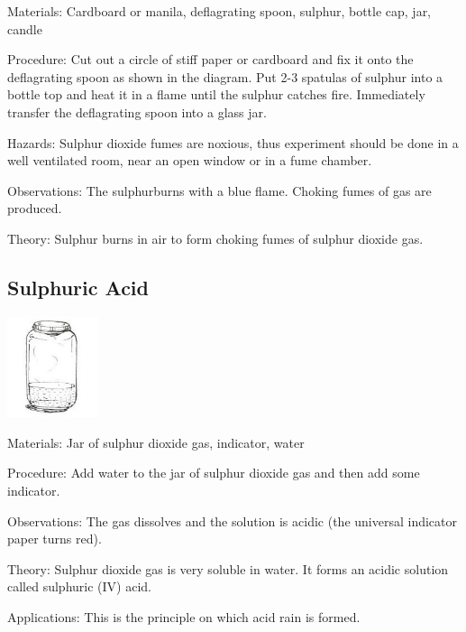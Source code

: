 \begin{multicols}{2}
\begin{description*}
\item[Materials:]{Cardboard or manila, deflagrating spoon, sulphur, bottle cap, jar, candle}
\item[Procedure:]{Cut out a circle of stiff paper or cardboard and
fix it onto the deflagrating spoon as shown in the
diagram. Put 2-3 spatulas of sulphur into a bottle
top and heat it in a flame until the sulphur
catches fire. Immediately transfer the
deflagrating spoon into a glass jar.}
\item[Hazards:]{Sulphur dioxide fumes are noxious, thus
experiment should be done in a well ventilated
room, near an open window or in a fume
chamber.}
\item[Observations:]{The sulphurburns with a blue flame. Choking
fumes of gas are produced.}
\item[Theory:]{Sulphur burns in air to form choking fumes
of sulphur dioxide gas.}
\end{description*}

\subsection{Sulphuric Acid} 

\begin{center}
\includegraphics[width=0.2\textwidth]{./img/source/sulphuric-acid.jpg}
\end{center}

\begin{description*}
\item[Materials:]{Jar of sulphur dioxide gas, indicator, water}
\item[Procedure:]{Add water to the jar of sulphur dioxide gas and
then add some indicator.}
\item[Observations:]{The gas dissolves and the solution is acidic
(the universal indicator paper turns red).}
\item[Theory:]{Sulphur dioxide gas is very soluble in water.
It forms an acidic solution called sulphuric (IV)
acid. }
\item[Applications:]{This is the principle on which acid rain is
formed.}
\end{description*}


\end{multicols}
